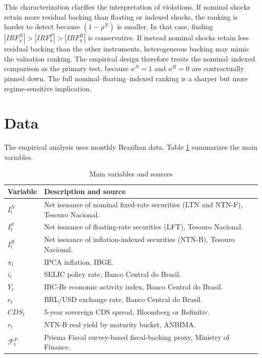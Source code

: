 \documentclass[12pt,a4paper]{article}
\begin{document}
This characterization clarifies the interpretation of violations. If nominal shocks retain more residual backing than floating or indexed shocks, the ranking is harder to detect because \((1-\rho^N)\) is smaller. In that case, finding \(|IRF_{\pi}^{N}|>|IRF_{\pi}^{F}|>|IRF_{\pi}^{R}|\) is conservative. If instead nominal shocks retain less residual backing than the other instruments, heterogeneous backing may mimic the valuation ranking. The empirical design therefore treats the nominal--indexed comparison as the primary test, because \(\kappa^N=1\) and \(\kappa^R=0\) are contractually pinned down. The full nominal--floating--indexed ranking is a sharper but more regime-sensitive implication.

\section{Data}
\label{sec:data}

The empirical analysis uses monthly Brazilian data. Table \ref{tab:variables} summarizes the main variables.

\begin{table}[h!]
\centering
\caption{Main variables and sources}
\label{tab:variables}
\begin{tabularx}{\textwidth}{lX}
\toprule
Variable & Description and source \\
\midrule
\(I_t^N\) & Net issuance of nominal fixed-rate securities (LTN and NTN-F), Tesouro Nacional. \\
\(I_t^F\) & Net issuance of floating-rate securities (LFT), Tesouro Nacional. \\
\(I_t^R\) & Net issuance of inflation-indexed securities (NTN-B), Tesouro Nacional. \\
\(\pi_t\) & IPCA inflation, IBGE. \\
\(i_t\) & SELIC policy rate, Banco Central do Brasil. \\
\(Y_t\) & IBC-Br economic activity index, Banco Central do Brasil. \\
\(e_t\) & BRL/USD exchange rate, Banco Central do Brasil. \\
\(CDS_t\) & 5-year sovereign CDS spread, Bloomberg or Refinitiv. \\
\(r_t\) & NTN-B real yield by maturity bucket, ANBIMA. \\
\(\mathcal{F}_t^P\) & Prisma Fiscal survey-based fiscal-backing proxy, Ministry of Finance. \\
\bottomrule
\end{tabularx}
\end{table}
\end{document}
